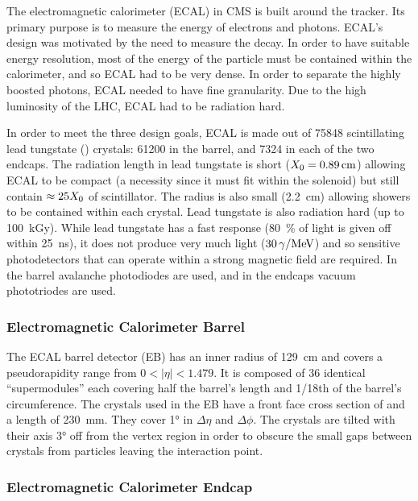 The electromagnetic calorimeter (ECAL) in CMS is built around the tracker. Its
primary purpose is to measure the energy of electrons and photons. ECAL's
design was motivated by the need to measure the \higgstogammagamma decay. In
order to have suitable energy resolution, most of the energy of the particle
must be contained within the calorimeter, and so ECAL had to be very dense. In
order to separate the highly boosted photons, ECAL needed to have fine
granularity. Due to the high luminosity of the LHC, ECAL had to be radiation
hard.

In order to meet the three design goals, ECAL is made out of \num{75848}
scintillating lead tungstate (\leadtungstate) crystals: \num{61200} in the
barrel, and \num{7324} in each of the two endcaps. The radiation length in lead
tungstate is short ($X_{0} = \SI{0.89}{\centi\meter}$) allowing ECAL
to be compact (a necessity since it must fit within the solenoid) but still
contain $\approx 25X_{0}$ of scintillator. The \Moliere radius is
also small (\SI{2.2}{\centi\meter}) allowing showers to be contained within
each crystal. Lead tungstate is also radiation hard (up to
\SI{100}{\kilo\gray}). While lead tungstate has a fast response
(\SI{80}{\percent} of light is given off within \SI{25}{\nano\second}), it does
not produce very much light ($\SI{30}{\photon\per\MeV}$) and so sensitive
photodetectors that can operate within a strong magnetic field are required. In
the barrel avalanche photodiodes are used, and in the endcaps vacuum
phototriodes are used.

\subsubsection{Electromagnetic Calorimeter Barrel}

The ECAL barrel detector (EB) has an inner radius of \SI{129}{\centi\meter} and
covers a pseudorapidity range from $0 < |\eta| < 1.479$. It is composed of 36
identical ``supermodules'' each covering half the barrel's length and 1/18th of
the barrel's circumference. The crystals used in the EB have a front face cross
section of  and a length of
\SI{230}{\milli\meter}. They cover \ang{1} in $\Delta \eta$ and $\Delta \phi$.
The crystals are tilted with their axis \ang{3} off from the vertex region in
order to obscure the small gaps between crystals from particles leaving the
interaction point.

\subsubsection{Electromagnetic Calorimeter Endcap}

